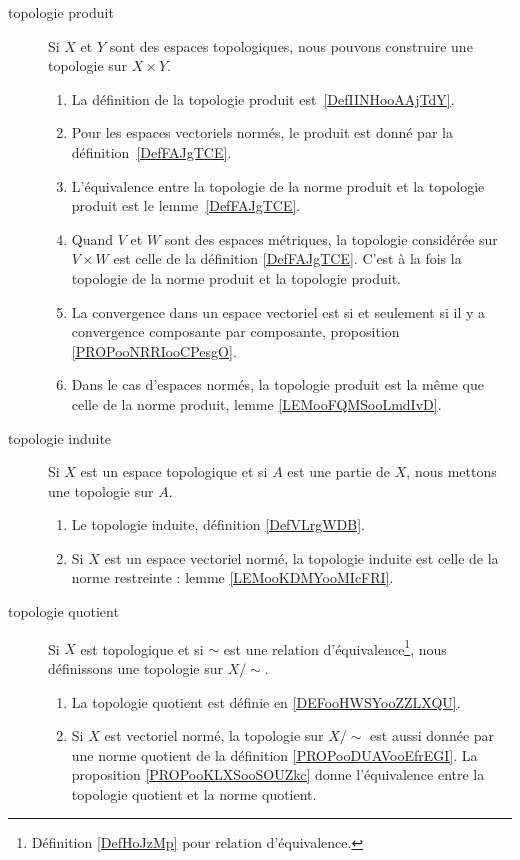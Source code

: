        \label{THEMEooYRIWooDXZnhX}
\begin{description}
	\item[topologie produit]
		Si \( X\) et \( Y\) sont des espaces topologiques, nous pouvons construire une topologie sur \( X\times Y\).
		\begin{enumerate}
			\item
			      La définition de la topologie produit est~\ref{DefIINHooAAjTdY}.
			\item
			      Pour les espaces vectoriels normés, le produit est donné par la définition~\ref{DefFAJgTCE}.
			\item
			      L'équivalence entre la topologie de la norme produit et la topologie produit est le lemme~\ref{DefFAJgTCE}.
			\item
			      Quand \( V\) et \( W\) sont des espaces métriques, la topologie considérée sur \( V\times W\) est celle de la définition \ref{DefFAJgTCE}. C'est à la fois la topologie de la norme produit et la topologie produit.
			\item
			      La convergence dans un espace vectoriel est si et seulement si il y a convergence composante par composante, proposition \ref{PROPooNRRIooCPesgO}.
			\item Dans le cas d'espaces normés, la topologie produit est la même que celle de la norme produit, lemme \ref{LEMooFQMSooLmdIvD}.
		\end{enumerate}
	\item[topologie induite]
		Si \( X\) est un espace topologique et si \( A\) est une partie de \( X\), nous mettons une topologie sur \( A\).
		\begin{enumerate}
			\item Le topologie induite, définition \ref{DefVLrgWDB}.
			\item Si \( X\) est un espace vectoriel normé, la topologie induite est celle de la norme restreinte : lemme \ref{LEMooKDMYooMIcFRI}.
		\end{enumerate}
	\item[topologie quotient]
		Si \( X\) est topologique et si \( \sim\) est une relation d'équivalence\footnote{Définition \ref{DefHoJzMp} pour relation d'équivalence.}, nous définissons une topologie sur \( X/\sim\).
		\begin{enumerate}
			\item La topologie quotient est définie en \ref{DEFooHWSYooZZLXQU}.
			\item
			      Si \( X\) est vectoriel normé, la topologie sur \( X/\sim\) est aussi donnée par une norme quotient de la définition \ref{PROPooDUAVooEfrEGI}. La proposition \ref{PROPooKLXSooSOUZkc} donne l'équivalence entre la topologie quotient et la norme quotient.

\end{enumerate}
\end{description}
